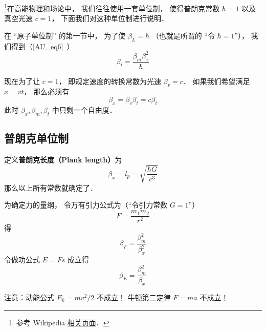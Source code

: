 
\begin{issues}
\issueDraft
\end{issues}


\footnote{参考 Wikipedia \href{https://en.wikipedia.org/wiki/Natural_units}{相关页面}．}在高能物理和场论中， 我们往往使用一套单位制， 使得普朗克常数 $\hbar = 1$ 以及真空光速 $c = 1$， 下面我们对这种单位制进行说明．

在 “原子单位制” 的第一节中， 为了使 $\beta_L = \hbar$ （也就是所谓的 “令 $\hbar = 1$”）， 我们得到（\autoref{AU_eq6}~）
\begin{equation}\label{NatUni_eq1}
\beta_t = \frac{\beta_m \beta_x^2}{\hbar}
\end{equation}

现在为了让 $c = 1$， 即规定速度的转换常数为光速 $\beta_v = c$． 如果我们希望满足 $x = vt$， 那么必须有
\begin{equation}
\beta_x = \beta_v \beta _t = c\beta_t
\end{equation}
此时 $\beta_x, \beta_m, \beta_t$ 中只剩一个自由度．

\subsection{普朗克单位制}
定义\textbf{普朗克长度（Plank length）}为
\begin{equation}
\beta_x = l_p = \sqrt{\frac{\hbar G}{c^3}}
\end{equation}
那么以上所有常数就确定了．

为确定力的量纲， 令万有引力公式为（“令引力常数 $G = 1$”）
\begin{equation}
F = \frac{m_1 m_2}{r^2}
\end{equation}
得
\begin{equation}
\beta_F = \frac{\beta_m^2}{\beta_x^2}
\end{equation}
令做功公式 $E = Fs$ 成立得
\begin{equation}
\beta_E = \frac{\beta_m^2}{\beta_x}
\end{equation}




注意：动能公式 $E_k = mv^2/2$ 不成立！ 牛顿第二定律 $F = ma$ 不成立！


